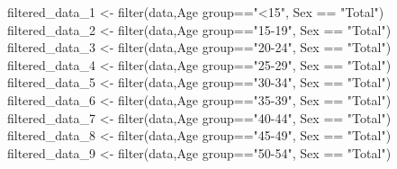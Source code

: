 \documentclass[
  11pt,
  a4paper,
  DIV=11,
  numbers=noendperiod]{scrartcl}
\newenvironment{Shaded}{\begin{snugshade}}{\end{snugshade}}
\newcommand{\AttributeTok}[1]{\textcolor[rgb]{0.40,0.45,0.13}{#1}}
\newcommand{\FunctionTok}[1]{\textcolor[rgb]{0.28,0.35,0.67}{#1}}
\newcommand{\NormalTok}[1]{\textcolor[rgb]{0.00,0.23,0.31}{#1}}
\newcommand{\OtherTok}[1]{\textcolor[rgb]{0.00,0.23,0.31}{#1}}
\newcommand{\SpecialCharTok}[1]{\textcolor[rgb]{0.37,0.37,0.37}{#1}}
\newcommand{\StringTok}[1]{\textcolor[rgb]{0.13,0.47,0.30}{#1}}
\begin{document}
\begin{Shaded}
\begin{Highlighting}[]
\NormalTok{filtered\_data\_1 }\OtherTok{\textless{}{-}} \FunctionTok{filter}\NormalTok{(data,}\StringTok{\textasciigrave{}}\AttributeTok{Age group}\StringTok{\textasciigrave{}}\SpecialCharTok{==}\StringTok{"\textless{}15"}\NormalTok{, Sex }\SpecialCharTok{==} \StringTok{"Total"}\NormalTok{)}
\NormalTok{filtered\_data\_2 }\OtherTok{\textless{}{-}} \FunctionTok{filter}\NormalTok{(data,}\StringTok{\textasciigrave{}}\AttributeTok{Age group}\StringTok{\textasciigrave{}}\SpecialCharTok{==}\StringTok{"15{-}19"}\NormalTok{, Sex }\SpecialCharTok{==} \StringTok{"Total"}\NormalTok{)}
\NormalTok{filtered\_data\_3 }\OtherTok{\textless{}{-}} \FunctionTok{filter}\NormalTok{(data,}\StringTok{\textasciigrave{}}\AttributeTok{Age group}\StringTok{\textasciigrave{}}\SpecialCharTok{==}\StringTok{"20{-}24"}\NormalTok{, Sex }\SpecialCharTok{==} \StringTok{"Total"}\NormalTok{)}
\NormalTok{filtered\_data\_4 }\OtherTok{\textless{}{-}} \FunctionTok{filter}\NormalTok{(data,}\StringTok{\textasciigrave{}}\AttributeTok{Age group}\StringTok{\textasciigrave{}}\SpecialCharTok{==}\StringTok{"25{-}29"}\NormalTok{, Sex }\SpecialCharTok{==} \StringTok{"Total"}\NormalTok{)}
\NormalTok{filtered\_data\_5 }\OtherTok{\textless{}{-}} \FunctionTok{filter}\NormalTok{(data,}\StringTok{\textasciigrave{}}\AttributeTok{Age group}\StringTok{\textasciigrave{}}\SpecialCharTok{==}\StringTok{"30{-}34"}\NormalTok{, Sex }\SpecialCharTok{==} \StringTok{"Total"}\NormalTok{)}
\NormalTok{filtered\_data\_6 }\OtherTok{\textless{}{-}} \FunctionTok{filter}\NormalTok{(data,}\StringTok{\textasciigrave{}}\AttributeTok{Age group}\StringTok{\textasciigrave{}}\SpecialCharTok{==}\StringTok{"35{-}39"}\NormalTok{, Sex }\SpecialCharTok{==} \StringTok{"Total"}\NormalTok{)}
\NormalTok{filtered\_data\_7 }\OtherTok{\textless{}{-}} \FunctionTok{filter}\NormalTok{(data,}\StringTok{\textasciigrave{}}\AttributeTok{Age group}\StringTok{\textasciigrave{}}\SpecialCharTok{==}\StringTok{"40{-}44"}\NormalTok{, Sex }\SpecialCharTok{==} \StringTok{"Total"}\NormalTok{)}
\NormalTok{filtered\_data\_8 }\OtherTok{\textless{}{-}} \FunctionTok{filter}\NormalTok{(data,}\StringTok{\textasciigrave{}}\AttributeTok{Age group}\StringTok{\textasciigrave{}}\SpecialCharTok{==}\StringTok{"45{-}49"}\NormalTok{, Sex }\SpecialCharTok{==} \StringTok{"Total"}\NormalTok{)}
\NormalTok{filtered\_data\_9 }\OtherTok{\textless{}{-}} \FunctionTok{filter}\NormalTok{(data,}\StringTok{\textasciigrave{}}\AttributeTok{Age group}\StringTok{\textasciigrave{}}\SpecialCharTok{==}\StringTok{"50{-}54"}\NormalTok{, Sex }\SpecialCharTok{==} \StringTok{"Total"}\NormalTok{)}

\end{Highlighting}
\end{Shaded}
\end{document}
